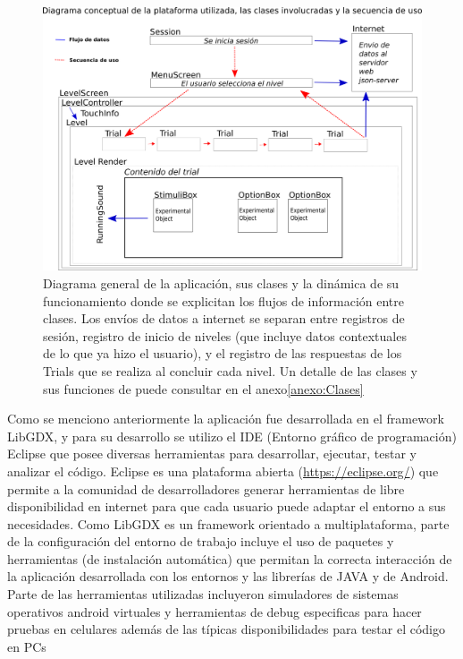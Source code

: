 \documentclass{article}
\begin{document}
    \begin{figure}
        \center
        \includegraphics[width=\textwidth]{Imagenes/FlujoJava.png}
        \caption{Diagrama general de la aplicación, sus clases y la dinámica de su funcionamiento donde se explicitan los flujos de información entre clases. Los envíos de datos a internet se separan entre registros de sesión, registro de inicio de niveles (que incluye datos contextuales de lo que ya hizo el usuario), y el registro de las respuestas de los Trials que se realiza al concluir cada nivel. Un detalle de las clases y sus funciones de puede consultar en el anexo\ref{anexo:Clases}}
        \label{fig:Flujo}
    \end{figure}

        
    Como se menciono anteriormente la aplicación fue desarrollada en el framework LibGDX, y para su desarrollo se utilizo el IDE (Entorno gráfico de programación) Eclipse que posee diversas herramientas para desarrollar, ejecutar, testar y analizar el código. Eclipse es una plataforma abierta (\url{https://eclipse.org/}) que permite a la comunidad de desarrolladores generar herramientas de libre disponibilidad en internet para que cada usuario puede adaptar el entorno a sus necesidades. Como LibGDX es un framework orientado a multiplataforma, parte de la configuración del entorno de trabajo incluye el uso de paquetes y herramientas (de instalación automática) que permitan la correcta interacción de la aplicación desarrollada con los entornos y las librerías de JAVA y de Android. Parte de las herramientas utilizadas incluyeron simuladores de sistemas operativos android virtuales y herramientas de debug especificas para hacer pruebas en celulares además de las típicas disponibilidades para testar el código en PCs
    
\end{document}
